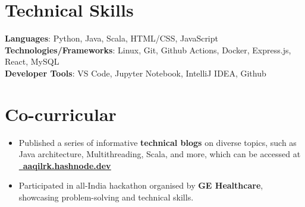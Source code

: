 \documentclass[letterpaper,11pt]{article}
\makeatletter
\newcommand{\resumeItem}[1]{
  \item\small{
    {#1 \vspace{-2pt}}
  }
}
\newcommand{\resumeSubheading}[4]{
  \vspace{-2pt}\item
    \begin{tabular*}{1.0\textwidth}[t]{l@{\extracolsep{\fill}}r}
      \textbf{#1} & \textbf{\small #2} \\
      \textit{\small#3} & \textit{\small #4} \\
    \end{tabular*}\vspace{-7pt}
}
\newcommand{\resumeSubHeadingListStart}{\begin{itemize}[leftmargin=0.0in, label={}]}
\newcommand{\resumeSubHeadingListEnd}{\end{itemize}}
\newcommand{\resumeItemListStart}{\begin{itemize}}
\newcommand{\resumeItemListEnd}{\end{itemize}\vspace{-5pt}}
\makeatother
\begin{document}
%
\section{Technical Skills}
 \begin{itemize}[leftmargin=0.15in, label={}]
    \small{\item{
     \textbf{Languages}{: Python, Java, Scala, HTML/CSS, JavaScript} \\
     \textbf{Technologies/Frameworks}{: Linux, Git, Github Actions, Docker, Express.js, React, MySQL} \\
     \textbf{Developer Tools}{: VS Code, Jupyter Notebook, IntelliJ IDEA, Github} \\
     
    }}
 \end{itemize}
 \vspace{-16pt}


\section{Co-curricular}
        
    \resumeSubHeadingListStart
      \resumeItemListStart
            \resumeItem{Published a series of informative \textbf{technical blogs} on diverse topics, such as Java architecture, Multithreading, Scala, and more, which can be accessed at \href{https://aaqilrk.hashnode.dev/}{\raisebox{-0.2\height}\faGlobe\ \textbf{\underline{aaqilrk.hashnode.dev}}}}
            \resumeItem{Participated in all-India hackathon organised by \textbf{GE Healthcare}, showcasing problem-solving and technical skills.}
      \resumeItemListEnd
    \resumeSubHeadingListEnd
\end{document}
